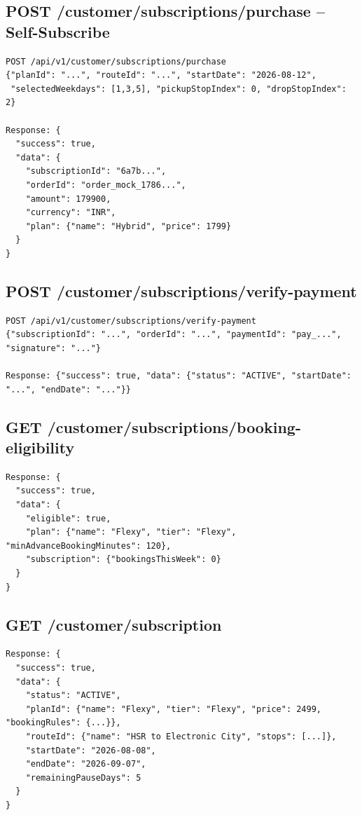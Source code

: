 \documentclass[11pt,a4paper]{article}
\begin{document}
\subsection{POST /customer/subscriptions/purchase -- Self-Subscribe}
\begin{lstlisting}
POST /api/v1/customer/subscriptions/purchase
{"planId": "...", "routeId": "...", "startDate": "2026-08-12",
 "selectedWeekdays": [1,3,5], "pickupStopIndex": 0, "dropStopIndex": 2}

Response: {
  "success": true,
  "data": {
    "subscriptionId": "6a7b...",
    "orderId": "order_mock_1786...",
    "amount": 179900,
    "currency": "INR",
    "plan": {"name": "Hybrid", "price": 1799}
  }
}
\end{lstlisting}

\subsection{POST /customer/subscriptions/verify-payment}
\begin{lstlisting}
POST /api/v1/customer/subscriptions/verify-payment
{"subscriptionId": "...", "orderId": "...", "paymentId": "pay_...", "signature": "..."}

Response: {"success": true, "data": {"status": "ACTIVE", "startDate": "...", "endDate": "..."}}
\end{lstlisting}

\subsection{GET /customer/subscriptions/booking-eligibility}
\begin{lstlisting}
Response: {
  "success": true,
  "data": {
    "eligible": true,
    "plan": {"name": "Flexy", "tier": "Flexy", "minAdvanceBookingMinutes": 120},
    "subscription": {"bookingsThisWeek": 0}
  }
}
\end{lstlisting}

\subsection{GET /customer/subscription}
\begin{lstlisting}
Response: {
  "success": true,
  "data": {
    "status": "ACTIVE",
    "planId": {"name": "Flexy", "tier": "Flexy", "price": 2499, "bookingRules": {...}},
    "routeId": {"name": "HSR to Electronic City", "stops": [...]},
    "startDate": "2026-08-08",
    "endDate": "2026-09-07",
    "remainingPauseDays": 5
  }
}
\end{lstlisting}
\end{document}
